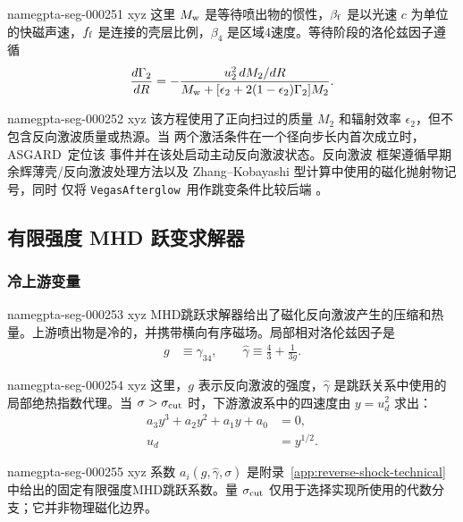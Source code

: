 \documentclass[twocolumn]{aastex702}
\makeatletter
\newcommand{\asgard}{\textsc{ASGARD}}
\newcommand{\vegas}{\texttt{VegasAfterglow}}
\providecommand{\gptareaderanchor}[1]{\pdfdest name{#1} xyz}%
\providecommand{\gptareaderanchor}[1]{\special{pdf:dest (#1) [ @thispage /XYZ @xpos @ypos null ]}}%
\makeatother
\begin{document}
\gptareaderanchor{gpta-seg-000251}%
这里 \(M_{\rm w}\) 是等待喷出物的惯性，\(\beta_{\rm f}\) 是以光速 \(c\) 为单位的快磁声速，\(f_{\rm f}\) 是连接的壳层比例，\(\beta_4\) 是区域4速度。等待阶段的洛伦兹因子遵循
\begin{equation}
\frac{d\Gamma_2}{dR}
=-\frac{u_2^2\,dM_2/dR}
{M_{\rm w}+[\epsilon_2+2(1-\epsilon_2)\Gamma_2]M_2}.
\end{equation}

\gptareaderanchor{gpta-seg-000252}%
该方程使用了正向扫过的质量 \(M_2\) 和辐射效率
\(\epsilon_2\)，但不包含反向激波质量或热源。当
两个激活条件在一个径向步长内首次成立时，\asgard\ 定位该
事件并在该处启动主动反向激波状态。反向激波
框架遵循早期余辉薄壳/反向激波处理方法以及
Zhang--Kobayashi 型计算中使用的磁化抛射物记号，同时
仅将 \vegas\ 用作跳变条件比较后端
\citep{SariPiran1999,Kobayashi2000,ZhangKobayashi2005,PeerWijers2006,Giannios2008,Wang2025VegasAfterglow}。

\subsection{有限强度 MHD 跃变求解器}

\subsubsection{冷上游变量}


\gptareaderanchor{gpta-seg-000253}%
MHD跳跃求解器给出了磁化反向激波产生的压缩和热量。上游喷出物是冷的，并携带横向有序磁场。局部相对洛伦兹因子是
\begin{equation}
\begin{aligned}
g&\equiv\gamma_{34},\qquad
\hat{\gamma}\equiv \frac{4}{3}+\frac{1}{3g}.
\end{aligned}
\end{equation}

\gptareaderanchor{gpta-seg-000254}%
这里，\(g\) 表示反向激波的强度，\(\hat{\gamma}\) 是跳跃关系中使用的局部绝热指数代理。当 \(\sigma>\sigma_{\rm cut}\) 时，下游激波系中的四速度由 \(y=u_d^2\) 求出：
\begin{equation}
\begin{aligned}
a_3y^3+a_2y^2+a_1y+a_0&=0,\\
u_d&=y^{1/2}.
\end{aligned}
\end{equation}

\gptareaderanchor{gpta-seg-000255}%
系数 \(a_i(g,\hat{\gamma},\sigma)\) 是附录~\ref{app:reverse-shock-technical}中给出的固定有限强度MHD跳跃系数。量 \(\sigma_{\rm cut}\) 仅用于选择实现所使用的代数分支；它并非物理磁化边界。
\end{document}
